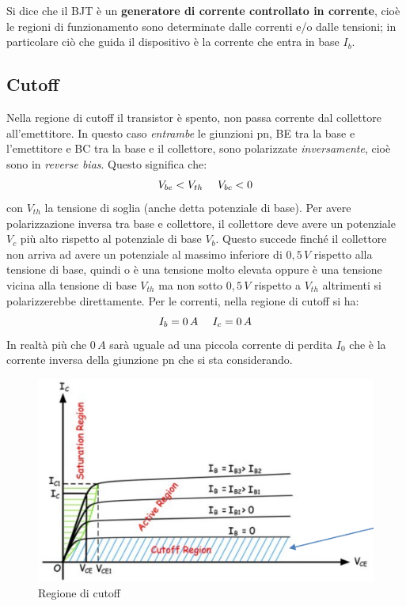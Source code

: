 \documentclass[12pt, a4paper]{report}
\begin{document}
Si dice che il BJT è un \textbf{generatore di corrente controllato in corrente}, cioè le regioni di funzionamento sono determinate dalle correnti e/o dalle tensioni; in particolare ciò che guida il dispositivo è la corrente che entra in base $I_{b}$.

\subsection{Cutoff}
Nella regione di cutoff il transistor è spento, non passa corrente dal collettore all'emettitore. In questo caso \textit{entrambe} le giunzioni pn, BE tra la base e l'emettitore e BC tra la base e il collettore, sono polarizzate \textit{inversamente}, cioè sono in \textit{reverse bias}. Questo significa che:
\begin{equation*}
    V_{be} < V_{th} \text{ \, \, } V_{bc} < 0
\end{equation*}
con $V_{th}$ la tensione di soglia (anche detta potenziale di base). Per avere polarizzazione inversa tra base e collettore, il collettore deve avere un potenziale $V_{c}$ più alto rispetto al potenziale di base $V_{b}$. Questo succede finché il collettore non arriva ad avere un potenziale al massimo inferiore di $0,5\,V$ rispetto alla tensione di base, quindi o è una tensione molto elevata oppure è una tensione vicina alla tensione di base $V_{th}$ ma non sotto $0,5\,V$ rispetto a $V_{th}$ altrimenti si polarizzerebbe direttamente. Per le correnti, nella regione di cutoff si ha:
\begin{equation}
    I_{b} = 0\,A \text{ \, \, } I_{c} = 0\,A
\end{equation}
In realtà più che $0\,A$ sarà uguale ad una piccola corrente di perdita $I_{0}$ che è la corrente inversa della giunzione pn che si sta considerando.
\begin{figure}[h]
    \centering
    \includegraphics[scale=0.4,angle=0]{bjt_cutoff.png}
    \caption{Regione di cutoff}
\end{figure}
\end{document}
